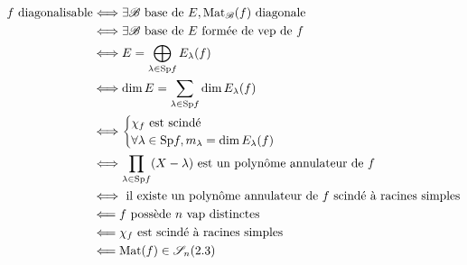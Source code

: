 \newpage

\begin{Large}
\begin{align*}
    f \text{ diagonalisable} &\Longleftrightarrow \exists \mathscr{B} \text{ base de } E, \mathrm{Mat}_\mathscr{B}(f) \text{ diagonale} \\
    &\Longleftrightarrow \exists \mathscr{B} \text{ base de } E \text{ formée de vep de } f\\
    &\Longleftrightarrow E = \bigoplus_{\lambda \in \mathrm{Sp} f} E_\lambda(f) \\
    &\Longleftrightarrow \dim E = \sum_{\lambda \in \mathrm{Sp} f} \dim E_\lambda(f) \\
    &\Longleftrightarrow 
    \begin{cases}
    \chi_f \text{ est scindé} \\
    \forall \lambda \in \mathrm{Sp} f, m_{\lambda} = \dim E_\lambda(f)
    \end{cases} \\
    &\Longleftrightarrow \prod_{\lambda \in \mathrm{Sp} f}(X-\lambda) \text{ est un polynôme annulateur de } f\\
    &\Longleftrightarrow \text{ il existe un polynôme annulateur de } f \text{ scindé à racines simples} \\
    &\Longleftarrow f \text{ possède } n \text{ vap distinctes} \\
    &\Longleftarrow \chi_f \text{ est scindé à racines simples} \\
    &\Longleftarrow \mathrm{Mat}(f) \in \mathscr{S}_n(2.3)
\end{align*}
\end{Large}
